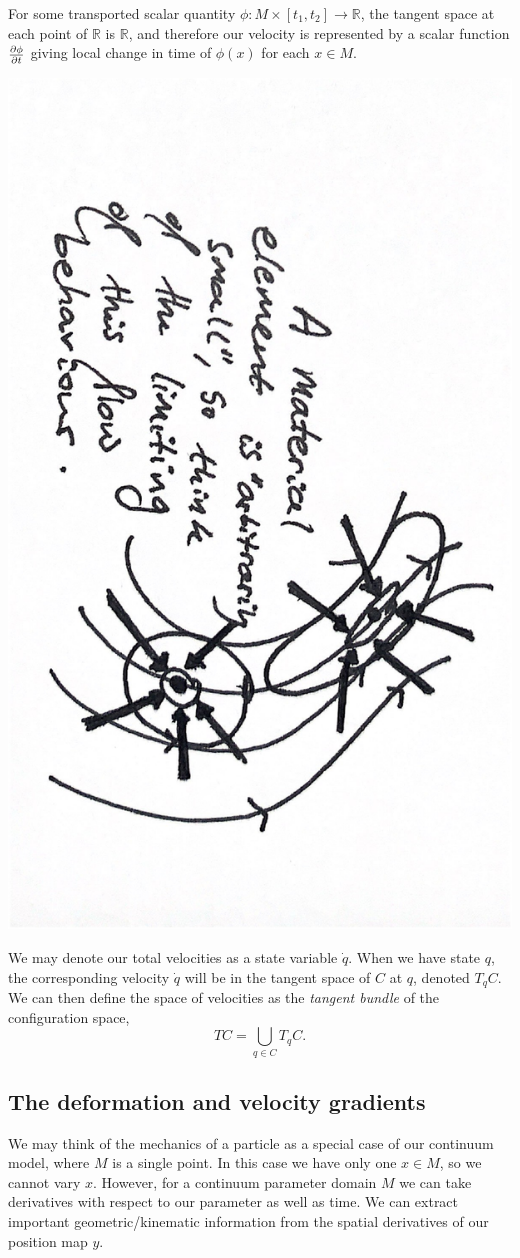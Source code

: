 For some transported scalar quantity $\phi : M \times [t_1, t_2] \rightarrow \mathbb{R}$, the tangent space at each point of $\mathbb{R}$ is $\mathbb{R}$,
and therefore our velocity is represented by a scalar function $\frac{\partial \phi}{\partial t}$ giving local change in time of $\phi(x)$ for each $x \in M$.

\begin{center}
\includegraphics[angle=90,page=3,width=0.8\linewidth]{figures/2.pdf}
\end{center}

We may denote our total velocities as a state variable $\dot{q}$. 
When we have state $q$, the corresponding velocity $\dot{q}$ will be in the tangent space of $C$ at $q$, denoted $T_q C$.
We can then define the space of velocities as the \textit{tangent bundle} of the configuration space,
    $$TC = \bigcup_{q \in C} T_q C.$$
\subsection{The deformation and velocity gradients}\label{deformation_and_velocity_gradients}
We may think of the mechanics of a particle as a special case of our continuum model, where
$M$ is a single point. In this case we have only one $x \in M$, so we cannot vary $x$.
However, for a continuum parameter domain $M$ we can take derivatives with respect to our parameter as well as time.
We can extract important geometric/kinematic information from the spatial derivatives of our position map $y$.

